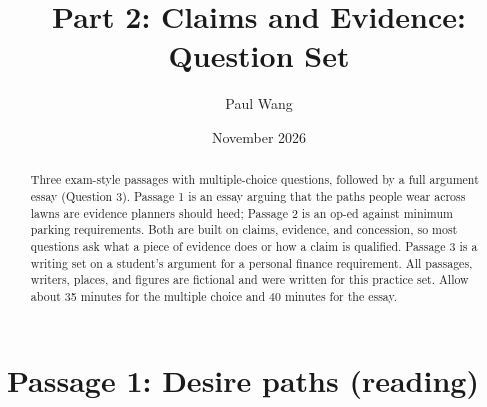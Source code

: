 \documentclass[11pt]{article}
\title{Part 2: Claims and Evidence: Question Set}
\author{Paul Wang}
\date{November 2026}
\begin{document}
\maketitle

\begin{abstract}
Three exam-style passages with multiple-choice questions, followed by a full argument essay (Question 3). Passage 1 is an essay arguing that the paths people wear across lawns are evidence planners should heed; Passage 2 is an op-ed against minimum parking requirements. Both are built on claims, evidence, and concession, so most questions ask what a piece of evidence does or how a claim is qualified. Passage 3 is a writing set on a student's argument for a personal finance requirement. All passages, writers, places, and figures are fictional and were written for this practice set. Allow about 35 minutes for the multiple choice and 40 minutes for the essay.
\end{abstract}


\section{Passage 1: Desire paths (reading)}
\end{document}
